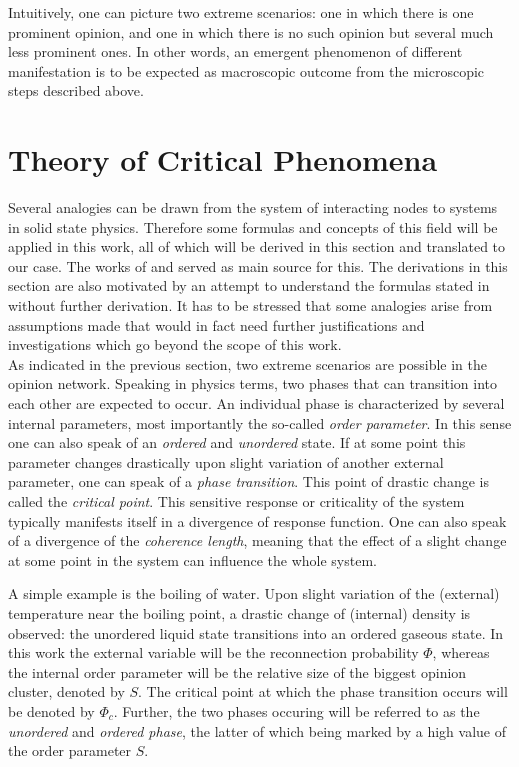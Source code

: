 \documentclass[11pt]{article}
\begin{document}
Intuitively, one can picture two extreme scenarios: one in which there is one prominent opinion, and one in which there is no such opinion but several much less prominent ones. In other words, an emergent phenomenon of different manifestation is to be expected as macroscopic outcome from the microscopic steps described above.


\section{Theory of Critical Phenomena}
\label{Sec:Theory}

Several analogies can be drawn from the system of interacting nodes to systems in solid state physics. Therefore some formulas and concepts of this field will be applied in this work, all of which will be derived in this section and translated to our case. The works of \cite{ASSP} and \cite{Nolting} served as main source for this. The derivations in this section are also motivated by an attempt to understand the formulas stated in \cite{main paper} without further derivation. It has to be stressed that some analogies arise from assumptions made that would in fact need further justifications and investigations which go beyond the scope of this work.\\


As indicated in the previous section, two extreme scenarios are possible in the opinion network. Speaking in physics terms, two phases that can transition into each other are expected to occur. An individual phase is characterized by several internal parameters, most importantly the so-called \textit{order parameter}. In this sense one can also speak of an \textit{ordered} and \textit{unordered} state. If at some point this parameter changes drastically upon slight variation of another external parameter, one can speak of a \textit{phase transition}. This point of drastic change is called the \textit{critical point}. This sensitive response or criticality of the system typically manifests itself in a divergence of response function. One can also speak of a divergence of the \textit{coherence length}, meaning that the effect of a slight change at some point in the system can influence the whole system. 

A simple example is the boiling of water. Upon slight variation of the (external) temperature near the boiling point, a drastic change of (internal) density is observed: the unordered liquid state transitions into an ordered gaseous state. In this work the external variable will be the reconnection probability $\Phi$, whereas the internal order parameter will be the relative size of the biggest opinion cluster, denoted by $S$. The critical point at which the phase transition occurs will be denoted by $\Phi_c$. Further, the two phases occuring will be referred to as the \textit{unordered} and \textit{ordered phase}, the latter of which being marked by a high value of the order parameter $S$.\\
\end{document}
